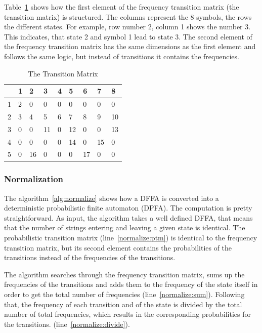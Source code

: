 \documentclass[
a4paper,
12pt
]{scrartcl}
\newcommand{\gray}{\cellcolor{grayself}}  %
\begin{document}
Table~\ref{table:transitionMatrix} shows how the first element of the frequency transition matrix (the transition matrix) is structured. The columns represent the 8 symbols, the rows the different states. For example,  row number 2, column 1 shows the number 3. This indicates, that state 2 and symbol 1 lead to state 3. The second element of the frequency transition matrix has the same dimensions as the first element and follows the same logic, but instead of transitions it contains the frequencies.

\begin{table}[ht!]
\centering
\begin{tabular}{|l|l|l|l|l|l|l|l|l|}
\hline
\gray &\gray 1 & \gray 2  & \gray 3  & \gray 4 & \gray 5  & \gray 6  & \gray 7  & \gray 8  \\ \hline
\gray 1&2 & 0  & 0  & 0 & 0  & 0  & 0  & 0  \\ \hline
\gray 2&3 & 4  & 5  & 6 & 7  & 8  & 9  & 10 \\ \hline
\gray 3&0 & 0  & 11 & 0 & 12 & 0  & 0  & 13 \\ \hline
\gray 4&0 & 0  & 0  & 0 & 14 & 0  & 15 & 0  \\ \hline
\gray 5&0 & 16 & 0  & 0 & 0  & 17 & 0  & 0  \\ \hline
\end{tabular}
\caption{The Transition Matrix}
\label{table:transitionMatrix}
\end{table}

\subsubsection{Normalization}

The algorithm~\ref{alg:normalize} shows how a DFFA is converted into a deterministic probabilistic finite automaton (DPFA). The computation is pretty straightforward. As input, the algorithm takes a well defined DFFA, that means that the number of strings entering and leaving a given state is identical. The probabilistic transition matrix (line~\ref{normalize:ptm}) is identical to the frequency transition matrix, but its second element contains the probabilities of the transitions instead of the frequencies of the transitions.

The algorithm searches through the frequency transition matrix, sums up the frequencies of the transitions and adds them to the frequency of the state itself in order to get the total number of frequencies (line~\ref{normalize:sum}). Following that, the frequency of each transition and of the state is divided by the total number of total frequencies, which results in the corresponding probabilities for the transitions. (line~\ref{normalize:divide}).
\end{document}
